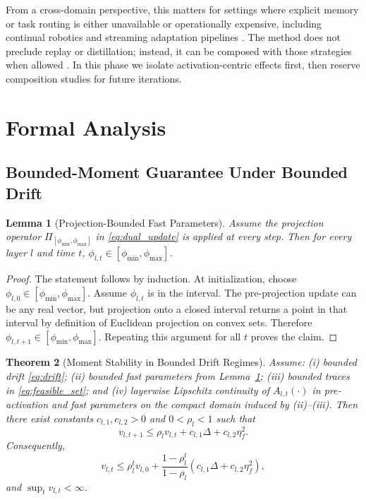 \documentclass{article} %
\newtheorem{theorem}{Theorem}[section]
\newtheorem{lemma}[theorem]{Lemma}
\begin{document}
From a cross-domain perspective, this matters for settings where explicit memory or task routing is either unavailable or operationally expensive, including continual robotics and streaming adaptation pipelines \citep{s28,s30,s31,s33}. The method does not preclude replay or distillation; instead, it can be composed with those strategies when allowed \citep{s5,s14,s36}. In this phase we isolate activation-centric effects first, then reserve composition studies for future iterations.

\section{Formal Analysis}
\subsection{Bounded-Moment Guarantee Under Bounded Drift}
\begin{lemma}[Projection-Bounded Fast Parameters]
\label{lem:projection_bounded}
Assume the projection operator $\Pi_{[\phi_{\min},\phi_{\max}]}$ in \eqref{eq:dual_update} is applied at every step. Then for every layer $l$ and time $t$, $\phi_{l,t}\in[\phi_{\min},\phi_{\max}]$.
\end{lemma}

\begin{proof}
The statement follows by induction. At initialization, choose $\phi_{l,0}\in[\phi_{\min},\phi_{\max}]$. Assume $\phi_{l,t}$ is in the interval. The pre-projection update can be any real vector, but projection onto a closed interval returns a point in that interval by definition of Euclidean projection on convex sets. Therefore $\phi_{l,t+1}\in[\phi_{\min},\phi_{\max}]$. Repeating this argument for all $t$ proves the claim.
\end{proof}

\begin{theorem}[Moment Stability in Bounded Drift Regimes]
\label{thm:moment_stability}
Assume: (i) bounded drift \eqref{eq:drift}; (ii) bounded fast parameters from Lemma~\ref{lem:projection_bounded}; (iii) bounded traces in \eqref{eq:feasible_set}; and (iv) layerwise Lipschitz continuity of $A_{l,t}(\cdot)$ in pre-activation and fast parameters on the compact domain induced by (ii)--(iii). Then there exist constants $c_{l,1},c_{l,2}>0$ and $0<\rho_l<1$ such that
\begin{equation}
v_{l,t+1}\le \rho_l v_{l,t}+c_{l,1}\Delta+c_{l,2}\eta_f^2.
\label{eq:moment_recursion}
\end{equation}
Consequently,
\begin{equation}
v_{l,t}\le \rho_l^t v_{l,0}+\frac{1-\rho_l^t}{1-\rho_l}\left(c_{l,1}\Delta+c_{l,2}\eta_f^2\right),
\label{eq:moment_closed_form}
\end{equation}
and $\sup_t v_{l,t}<\infty$.
\end{theorem}
\end{document}
